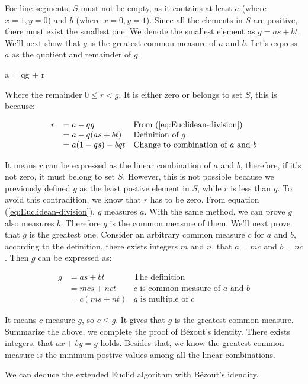 \documentclass{article}
\begin{document}
For line segments, $S$ must not be empty, as it contains at least $a$ (where $x = 1, y = 0$) and $b$ (where $x = 0, y = 1$). Since all the elements in $S$ are positive, there must exist the smallest one. We denote the smallest element as $g = as + bt$. We'll next show that $g$ is the greatest common measure of $a$ and $b$. Let's express $a$ as the quotient and remainder of $g$.

\be
a = qg + r
\label{eq:Euclidean-division}
\ee

Where the remainder $0 \leq r < g$. It is either zero or belongs to set $S$, this is because:

\[
\begin{array}{rll}
r & = a - qg & \text{From (\ref{eq:Euclidean-division})} \\
  & = a - q(as + bt) & \text{Definition of}\ g \\
  & = a(1 - qs) - bqt & \text{Change to combination of}\ a\ \text{and}\ b
\end{array}
\]

It means $r$ can be expressed as the linear combination of $a$ and $b$, therefore, if it's not zero, it must belong to set $S$. However, this is not possible because we previously defined $g$ as the least postive element in $S$, while $r$ is less than $g$. To avoid this contradition, we know that $r$ has to be zero. From equation (\ref{eq:Euclidean-division}), $g$ measures $a$. With the same method, we can prove $g$ also measures $b$. Therefore $g$ is the common measure of them. We'll next prove that $g$ is the greatest one. Consider an arbitrary common measure $c$ for $a$ and $b$, according to the definition, there exists integers $m$ and $n$, that $a = mc$ and $b = nc$. Then $g$ can be expressed as:

\[
\begin{array}{rll}
g & = as + bt & \text{The definition} \\
  & = mcs + nct & \text{$c$ is common measure of $a$ and $b$} \\
  & = c(ms + nt) & \text{$g$ is multiple of $c$}
\end{array}
\]

It means $c$ measure $g$, so $c \leq g$. It gives that $g$ is the greatest common measure. Summarize the above, we complete the proof of Bézout's identity. There exists integers, that $ax + by = g$ holds. Besides that, we know the greatest common measure is the minimum postive values among all the linear combinations.

We can deduce the extended Euclid algorithm with Bézout's idendity.
\end{document}
